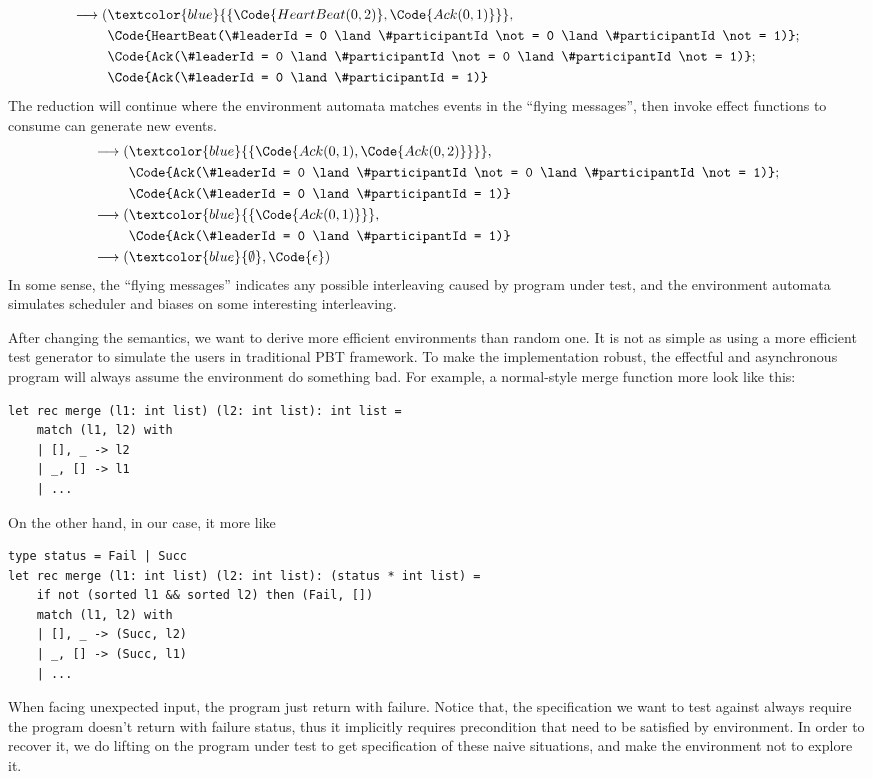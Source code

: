 \begin{align*}
    \longrightarrow (&\textcolor{blue}{\{\Code{HeartBeat(0, 2)}, \Code{Ack(0, 1)}\}},
    \\&\Code{HeartBeat(\#leaderId = 0 \land \#participantId \not= 0 \land \#participantId \not= 1)};
    \\&\Code{Ack(\#leaderId = 0 \land \#participantId \not= 0 \land \#participantId \not= 1)};
    \\&\Code{Ack(\#leaderId = 0 \land \#participantId = 1)}
\end{align*}\noindent
The reduction will continue where the environment automata matches events in the ``flying messages'', then invoke effect functions to consume can generate new events.
\begin{align*}
    \longrightarrow (&\textcolor{blue}{\{\Code{Ack(0, 1), \Code{Ack(0, 2)}\}}},
    \\&\Code{Ack(\#leaderId = 0 \land \#participantId \not= 0 \land \#participantId \not= 1)};
    \\&\Code{Ack(\#leaderId = 0 \land \#participantId = 1)}
    \\\longrightarrow (&\textcolor{blue}{\{\Code{Ack(0, 1)}\}},
    \\&\Code{Ack(\#leaderId = 0 \land \#participantId = 1)}
    \\\longrightarrow (&\textcolor{blue}{\emptyset}, \Code{\epsilon})
\end{align*}
In some sense, the ``flying messages'' indicates any possible interleaving caused by program under test, and the environment automata simulates scheduler and biases on some interesting interleaving.

After changing the semantics, we want to derive more efficient environments than random one. It is not as simple as using a more efficient test generator to simulate the users in traditional PBT framework. To make the implementation robust, the effectful and asynchronous program will always assume the environment do something bad. For example, a normal-style merge function more look like this:
\begin{verbatim}
let rec merge (l1: int list) (l2: int list): int list =
    match (l1, l2) with
    | [], _ -> l2
    | _, [] -> l1
    | ...
\end{verbatim}
On the other hand, in our case, it more like
\begin{verbatim}
type status = Fail | Succ
let rec merge (l1: int list) (l2: int list): (status * int list) =
    if not (sorted l1 && sorted l2) then (Fail, []) 
    match (l1, l2) with
    | [], _ -> (Succ, l2)
    | _, [] -> (Succ, l1)
    | ...
\end{verbatim}
When facing unexpected input, the program just return with failure. Notice that, the specification we want to test against always require the program doesn't return with failure status, thus it implicitly requires precondition that need to be satisfied by environment. In order to recover it, we do lifting on the program under test to get specification of these naive situations, and make the environment not to explore it.

